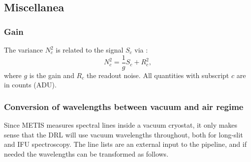 \subsection{Miscellanea}
\label{ssec:miscellanea}

%

\subsubsection{Gain}
\label{sssec:gain}

The variance $N_{c}^{2}$ is related to the signal $S_{c}$ via \cite[Section 9.1]{McLean2008}:
\begin{equation}
  \label{eq:signal-variance}
  N_{c}^{2} = \frac{1}{g} S_{c} + R_{c}^{2},
\end{equation}
where $g$ is the gain and $R_{c}$ the readout noise. All quantities with subscript $c$ are in counts (ADU).

\subsubsection{Conversion of wavelengths between vacuum and air regime}\label{ssec:vacair}

Since METIS measures spectral lines inside a vacuum cryostat, it only makes
sense that the DRL will use vacuum wavelengths throughout, both for long-slit
and IFU spectroscopy. The line lists are an external input to the pipeline, and
if needed the wavelengths can be transformed as follows.

